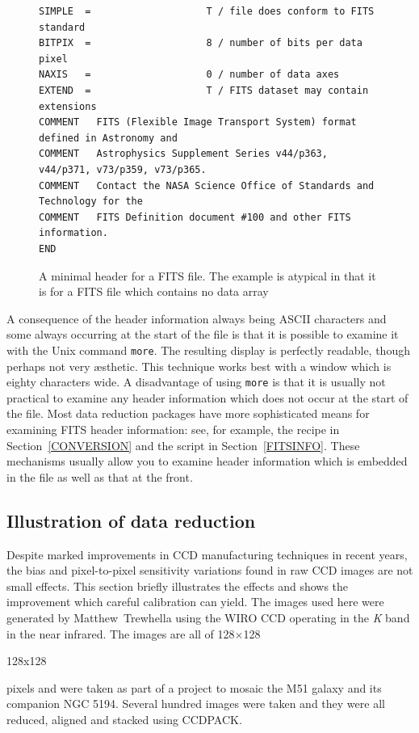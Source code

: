 \documentclass[twoside,11pt]{article}
\newenvironment{latexonly}{}{}
\begin{document}
\begin{figure}[htbp]

\begin{verbatim}
SIMPLE  =                    T / file does conform to FITS standard    
BITPIX  =                    8 / number of bits per data pixel    
NAXIS   =                    0 / number of data axes    
EXTEND  =                    T / FITS dataset may contain extensions    
COMMENT   FITS (Flexible Image Transport System) format defined in Astronomy and
COMMENT   Astrophysics Supplement Series v44/p363, v44/p371, v73/p359, v73/p365.
COMMENT   Contact the NASA Science Office of Standards and Technology for the   
COMMENT   FITS Definition document #100 and other FITS information.    
END                                                                       
\end{verbatim}

\begin{quote}
\caption[A minimal FITS file header]{A minimal header for a FITS
file.  The example is atypical in that it is for a FITS file which
contains no data array
\label{FITSHEAD} }
\end{quote}

\end{figure}

A consequence of the header information always being ASCII characters
and some always occurring at the start of the file is that it is possible
to examine it with the Unix command {\tt more}.  The resulting display is
perfectly readable, though perhaps not very \ae sthetic.  This technique
works best with a window which is eighty characters wide.  A disadvantage
of using {\tt more} is that it is usually not practical to examine any
header information which does not occur at the start of the file.  Most
data reduction packages have more sophisticated means for examining FITS
header information: see, for example, the recipe in Section~\ref{CONVERSION}
and the script in Section~\ref{FITSINFO}.  These mechanisms usually allow
you to examine header information which is embedded in the file as well
as that at the front.

\subsection{Illustration of data reduction}

Despite marked improvements in CCD manufacturing techniques in recent
years, the bias and pixel-to-pixel sensitivity variations found in raw
CCD images are not small effects.  This section briefly illustrates the
effects and shows the improvement which careful calibration can yield.
The images used here were generated by Matthew~Trewhella using the WIRO CCD
operating in the {\it K}\/ band in the near infrared.  The images are all of
\begin{latexonly} 
128$\times$128 
\end{latexonly}
\begin{htmlonly} 
128x128 
\end{htmlonly}
pixels and were taken as part of a project to mosaic the M51 galaxy
and its companion NGC 5194.  Several hundred images were taken and they were
all reduced, aligned and stacked using CCDPACK.
\end{document}
